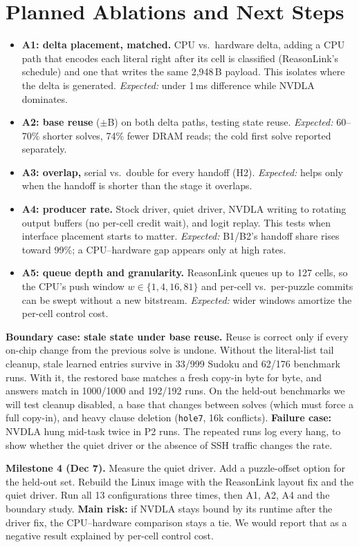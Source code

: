 \documentclass[conference,10pt,letterpaper]{IEEEtran}
\begin{document}
\section{Planned Ablations and Next Steps}
\begin{itemize}
\item \textbf{A1: delta placement, matched.} CPU vs.\ hardware delta, adding a CPU path that encodes each literal right after its cell is classified (ReasonLink's schedule) and one that writes the same 2,948\,B payload. This isolates where the delta is generated. \emph{Expected:} under 1\,ms difference while NVDLA dominates.
\item \textbf{A2: base reuse} ($\pm$B) on both delta paths, testing state reuse. \emph{Expected:} 60--70\% shorter solves, 74\% fewer DRAM reads; the cold first solve reported separately.
\item \textbf{A3: overlap,} serial vs.\ double for every handoff (H2). \emph{Expected:} helps only when the handoff is shorter than the stage it overlaps.
\item \textbf{A4: producer rate.} Stock driver, quiet driver, NVDLA writing to rotating output buffers (no per-cell credit wait), and logit replay. This tests when interface placement starts to matter. \emph{Expected:} B1/B2's handoff share rises toward 99\%; a CPU--hardware gap appears only at high rates.
\item \textbf{A5: queue depth and granularity.} ReasonLink queues up to 127 cells, so the CPU's push window $w\in\{1,4,16,81\}$ and per-cell vs.\ per-puzzle commits can be swept without a new bitstream. \emph{Expected:} wider windows amortize the per-cell control cost.
\end{itemize}

\textbf{Boundary case: stale state under base reuse.} Reuse is correct only if every on-chip change from the previous solve is undone. Without the literal-list tail cleanup, stale learned entries survive in 33/999 Sudoku and 62/176 benchmark runs. With it, the restored base matches a fresh copy-in byte for byte, and answers match in 1000/1000 and 192/192 runs. On the held-out benchmarks we will test cleanup disabled, a base that changes between solves (which must force a full copy-in), and heavy clause deletion (\texttt{hole7}, 16k conflicts). \textbf{Failure case:} NVDLA hung mid-task twice in P2 runs. The repeated runs log every hang, to show whether the quiet driver or the absence of SSH traffic changes the rate.

\textbf{Milestone 4 (Dec 7).} Measure the quiet driver. Add a puzzle-offset option for the held-out set. Rebuild the Linux image with the ReasonLink layout fix and the quiet driver. Run all 13 configurations three times, then A1, A2, A4 and the boundary study. \textbf{Main risk:} if NVDLA stays bound by its runtime after the driver fix, the CPU--hardware comparison stays a tie. We would report that as a negative result explained by per-cell control cost.
\end{document}
